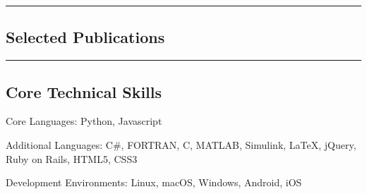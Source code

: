 \documentclass[10pt,letterpaper]{article}
\newenvironment{indentsection}[1]%
{\begin{list}{}%
	{\setlength{\leftmargin}{#1}}%
	\item[]%
}
{\end{list}}
\newcommand{\CPP}
{C\nolinebreak[4]\hspace{-.05em}\raisebox{.22ex}{\footnotesize\bf ++}}
\begin{document}
\hrule
\vspace{-0.2em}
\subsection*{Selected Publications}

\nocite{*}
\renewcommand{\section}[2]{}%


\hrule
\vspace{-0.4em}
\subsection*{Core Technical Skills}

\begin{indentsection}{\parindent}
	\begin{description*}
		\item[Core Languages:]
		Python, Javascript
		\item[Additional Languages:]
		C\#, FORTRAN, \CPP, MATLAB, Simulink, \LaTeX, jQuery, Ruby on Rails, HTML5, CSS3
		\item[Development Environments:]
		Linux, macOS, Windows, Android, iOS
	\end{description*}
\end{indentsection}
\end{document}
